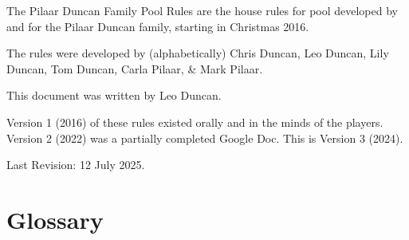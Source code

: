 \documentclass[a4paper, twocolumn]{article}
\newcommand{\currentversion}{3}
\newcommand{\currentversiondate}{12 July 2025}
\begin{document}
\setlength{\parindent}{0pt}

The Pilaar Duncan Family Pool Rules are the house rules for pool developed by and for the Pilaar Duncan family, starting in Christmas 2016.
\vspace{1em}

The rules were developed by (alphabetically) Chris Duncan, Leo Duncan, Lily Duncan, Tom Duncan, Carla Pilaar, \& Mark Pilaar.
\vspace{1em}

This document was written by Leo Duncan.
\vspace{1em}

Version 1 (2016) of these rules existed orally and in the minds of the players. Version 2 (2022) was a partially completed Google Doc. This is Version 3 (2024).
\vspace{1em}


Last Revision: \currentversiondate.

\newpage

\section{Glossary} \label{glossary}
\end{document}

